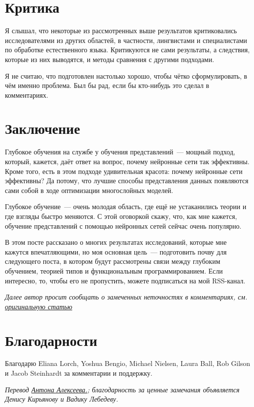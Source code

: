\documentclass[a4paper,12pt]{article}
\begin{document}
\section*{Критика}

Я слышал, что некоторые из рассмотренных выше результатов критиковались исследователями из других областей, в частности, лингвистами и специалистами по обработке естественного языка. Критикуются не сами результаты, а следствия, которые из них выводятся, и методы сравнения с другими подходами.

Я не считаю, что подготовлен настолько хорошо, чтобы чётко сформулировать, в чём именно проблема. Был бы рад, если бы кто-нибудь это сделал в комментариях.

\section*{Заключение}

Глубокое обучения на службе у обучения представлений~--- мощный подход, который, кажется, даёт ответ на вопрос, почему нейронные сети так эффективны. Кроме того, есть в этом подходе удивительная красота: почему нейронные сети эффективны? Да потому, что лучшие способы представления данных появляются сами собой в ходе оптимизации многослойных моделей.

Глубокое обучение~--- очень молодая область, где ещё не устаканились теории и где взгляды быстро меняются. С этой оговоркой скажу, что, как мне кажется, обучение представлений с помощью нейронных сетей сейчас очень популярно.

В этом посте рассказано о многих результатах исследований, которые мне кажутся впечатляющими, но моя основная цель~--- подготовить почву для следующего поста, в котором будут рассмотрены связи между глубоким обучением, теорией типов и функциональным программированием. Если интересно, то, чтобы его не пропустить, можете подписаться на мой RSS-канал.
 
{\it Далее автор просит сообщать о замеченных неточностях в комментариях, см. \href{http://colah.github.io/posts/2014-07-NLP-RNNs-Representations/}{оригинальную статью}} 
 
\section*{Благодарности}

Благодарю Eliana Lorch, Yoshua Bengio, Michael Nielsen, Laura Ball, Rob Gilson и Jacob Steinhardt за комментарии и поддержку.

\bigskip

{\it Перевод \href{http://www.stachek66.ru}{Антона Алексеева.}; благодарность за ценные замечания объявляется Денису Кирьянову и Вадику Лебедеву.}

\end{document}
